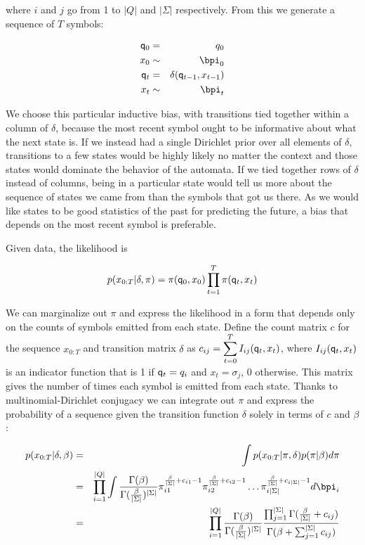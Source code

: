 where $i$ and $j$ go from 1 to $|Q|$ and $|\Sigma|$ respectively.  From this we generate a sequence of $T$ symbols:

\begin{eqnarray*}
\q_0 & = & q_0 \\
x_0 & \sim & \bpi_0 \\
\q_t & = & \delta(\q_{t-1},x_{t-1}) \\
x_t & \sim & \bpi_t
\end{eqnarray*}

We choose this particular inductive bias, with transitions tied together within a column of $\delta$, because the most recent symbol ought to be informative about what the next state is.  If we instead had a single Dirichlet prior over all elements of $\delta$, transitions to a few states would be highly likely no matter the context and those states would dominate the behavior of the automata.  If we tied together rows of $\delta$ instead of columns, being in a particular state would tell us more about the sequence of states we came from than the symbols that got us there.  As we would like states to be good statistics of the past for predicting the future, a bias that depends on the most recent symbol is preferable.

Given data, the likelihood is

\[ p(x_{0:T}|\delta,\pi) = \pi(\q_0,x_0)\prod_{t=1}^T \pi(\q_t,x_t) \]

We can marginalize out $\pi$ and express the likelihood in a form that depends only on the counts of symbols emitted from each state.  Define the count matrix $c$ for the sequence $x_{0:T}$ and transition matrix $\delta$ as $c_{ij} = \displaystyle\sum_{t=0}^T I_{ij}(\q_t,x_t)$, where $I_{ij}(\q_t,x_t)$ is an indicator function that is 1 if $\q_t = q_i$ and $x_t = \sigma_j$, 0 otherwise. This matrix gives the number of times each symbol is emitted from each state.  Thanks to multinomial-Dirichlet conjugacy we can integrate out $\pi$ and express the probability of a sequence given the transition function $\delta$ solely in terms of $c$ and $\beta$:

\begin{eqnarray}
 p(x_{0:T}|\delta,\beta) & = & \int p(x_{0:T}|\pi,\delta) p(\pi|\beta) d\pi \\
 & = &  \prod_{i=1}^{|Q|} \int \frac{\Gamma(\beta)}{\Gamma(\frac{\beta}{|\Sigma|})^{|\Sigma|}} \pi_{i1}^{\frac{\beta}{|\Sigma|}+c_{i1}-1} \pi_{i2}^{\frac{\beta}{|\Sigma|}+c_{i2}-1} \ldots \pi_{i|\Sigma|}^{\frac{\beta}{|\Sigma|}+c_{i|\Sigma|}-1} d\bpi_i\\
 & = & \prod_{i=1}^{|Q|} \frac{\Gamma(\beta)}{\Gamma(\frac{\beta}{|\Sigma|})^{|\Sigma|}} \frac{\prod_{j=1}^{|\Sigma|}\Gamma(\frac{\beta}{|\Sigma|} + c_{ij})}{\Gamma(\beta + \sum_{j=1}^{|\Sigma|} c_{ij})}
 \end{eqnarray}
 
